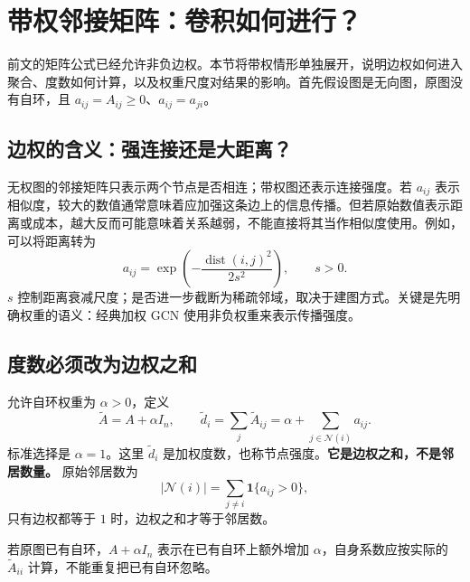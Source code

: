 \documentclass[UTF8,a4paper,11pt,fontset=fandol]{ctexart}
\begin{document}
\section{带权邻接矩阵：卷积如何进行？}
\label{sec:weighted}
前文的矩阵公式已经允许非负边权。本节将带权情形单独展开，说明边权如何进入聚合、度数如何计算，以及权重尺度对结果的影响。首先假设图是无向图，原图没有自环，且 $a_{ij}=A_{ij}\geq0$、$a_{ij}=a_{ji}$。

\subsection{边权的含义：强连接还是大距离？}
无权图的邻接矩阵只表示两个节点是否相连；带权图还表示连接强度。若 $a_{ij}$ 表示相似度，较大的数值通常意味着应加强这条边上的信息传播。但若原始数值表示距离或成本，越大反而可能意味着关系越弱，不能直接将其当作相似度使用。例如，可以将距离转为
\begin{equation}
a_{ij}=\exp\!\left(-\frac{\operatorname{dist}(i,j)^2}{2s^2}\right),\qquad s>0.
\end{equation}
$s$ 控制距离衰减尺度；是否进一步截断为稀疏邻域，取决于建图方式。关键是先明确权重的语义：经典加权 GCN 使用非负权重来表示传播强度。

\subsection{度数必须改为边权之和}
允许自环权重为 $\alpha>0$，定义
\begin{equation}
\widetilde A=A+\alpha I_n,\qquad
\widetilde d_i=\sum_j\widetilde A_{ij}
=\alpha+\sum_{j\in\mathcal N(i)}a_{ij}.
\label{eq:weighted-degree}
\end{equation}
标准选择是 $\alpha=1$。这里 $\widetilde d_i$ 是加权度数，也称节点强度。\textbf{它是边权之和，不是邻居数量。} 原始邻居数为
\begin{equation}
|\mathcal N(i)|=\sum_{j\ne i}\mathbf 1\{a_{ij}>0\},
\end{equation}
只有边权都等于 $1$ 时，边权之和才等于邻居数。

若原图已有自环，$A+\alpha I_n$ 表示在已有自环上额外增加 $\alpha$，自身系数应按实际的 $\widetilde A_{ii}$ 计算，不能重复把已有自环忽略。
\end{document}
